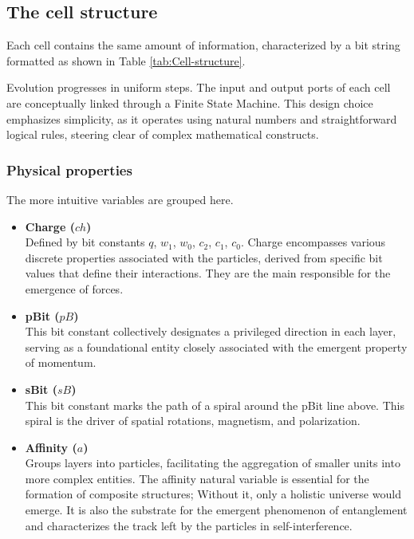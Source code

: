 \documentclass[12pt,english]{article}
\begin{document}
\subsection{The cell structure \label{subsec:The-cell-structure}}

Each cell contains the same amount of information, characterized by a bit string formatted as shown in Table \ref{tab:Cell-structure}.

Evolution progresses in uniform steps. The input and output ports of each cell are conceptually linked through a Finite State Machine. This design choice emphasizes simplicity, as it operates using natural numbers and straightforward logical rules, steering clear of complex mathematical constructs.

\subsubsection{Physical properties}
The more intuitive variables are grouped here.
\begin{itemize}
    \item \textbf{Charge ($ch$)} \\
Defined by bit constants $q$, $w_{1}$, $w_{0}$, $c_{2}$, $c_{1}$, $c_{0}$.
Charge encompasses various discrete properties associated with the particles, derived from specific bit values that define their interactions. They are the main responsible for the emergence of forces.

\item \textbf{pBit ($pB$)} \\
This bit constant collectively designates a privileged direction in each layer, serving as a foundational entity closely associated with the emergent property of momentum.

\item \textbf{sBit ($sB$)} \\
This bit constant marks the path of a spiral around the pBit line above. This spiral is the driver of spatial rotations, magnetism, and polarization.

\item \textbf{Affinity ($a$)} \\
    Groups layers into particles, facilitating the aggregation of smaller units into more complex entities. The affinity natural variable is essential for the formation of composite structures; Without it, only a holistic universe would emerge. It is also the substrate for the emergent phenomenon of entanglement and characterizes the track left by the particles in self-interference.
\end{itemize}
\end{document}
